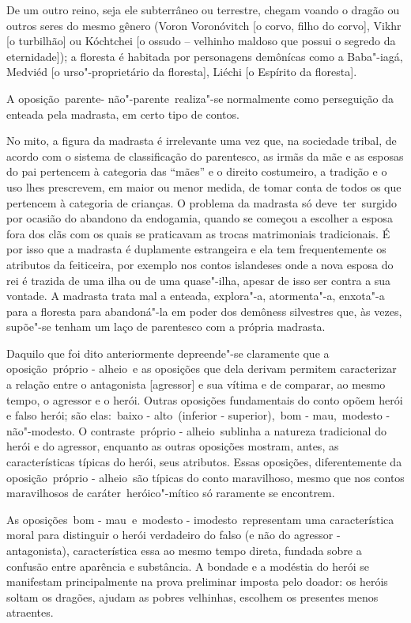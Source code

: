 De um outro reino, seja ele subterrâneo ou terrestre, chegam voando o
dragão ou outros seres do mesmo gênero (Voron Voronóvitch {[}o corvo,
filho do corvo{]}, Vikhr {[}o turbilhão{]} ou Kóchtchei {[}o ossudo --
velhinho maldoso que possui o segredo da eternidade{]}); a floresta é
habitada por personagens demônícas como a Baba"-iagá, Medviéd {[}o
urso"-proprietário da floresta{]}, Liéchi {[}o Espírito da floresta{]}.

A oposição~{parente- não"-parente}~realiza"-se normalmente como
perseguição da enteada pela madrasta, em certo tipo de contos.

No mito, a figura da madrasta é irrelevante uma vez que, na sociedade
tribal, de acordo com o sistema de classificação do parentesco, as irmãs
da mãe e as esposas do pai pertencem à categoria das ``mães'' e o
direito costumeiro, a tradição e o uso lhes prescrevem, em maior ou
menor medida, de tomar conta de todos os que pertencem à categoria de
crianças. O problema da madrasta só deve~ter~surgido por ocasião do
abandono da endogamia, quando se começou a escolher a esposa fora dos
clãs com os quais se praticavam as trocas matrimoniais tradicionais. É
por isso que a madrasta é duplamente estrangeira e ela tem
frequentemente os atributos da feiticeira, por exemplo nos contos
islandeses onde a nova esposa do rei é trazida de uma ilha ou de uma
quase"-ilha, apesar de isso ser contra a sua vontade. A madrasta trata
mal a enteada, explora"-a, atormenta"-a, enxota"-a para a floresta para
abandoná"-la em poder dos demôness silvestres que, às vezes, supõe"-se
tenham um laço de parentesco com a própria madrasta.

Daquilo que foi dito anteriormente depreende"-se claramente que a
oposição~{próprio - alheio}~e as oposições que dela derivam permitem
caracterizar a relação entre o antagonista {[}agressor{]} e sua vítima e
de comparar, ao mesmo tempo, o agressor e o herói. Outras oposições
fundamentais do conto opõem herói e falso herói; são elas:~{baixo -
alto}~(inferior - superior),~{bom - mau},~{modesto - não"-modesto}. O
contraste~{próprio - alheio}~sublinha a natureza tradicional do herói e
do agressor, enquanto as outras oposições mostram, antes, as
características típicas do herói, seus atributos. Essas oposições,
diferentemente da oposição~{próprio - alheio}~são típicas do conto
maravilhoso, mesmo que nos contos maravilhosos de caráter~heróico"-mítico
só raramente se encontrem.

As oposições~{bom - mau}~e~{modesto - imodesto}~representam uma
característica moral para distinguir o herói verdadeiro do falso (e não
do agressor - antagonista), característica essa ao mesmo tempo direta,
fundada sobre a confusão entre aparência e substância. A bondade e a
modéstia do herói se manifestam principalmente na prova preliminar
imposta pelo doador: os heróis soltam os dragões, ajudam as pobres
velhinhas, escolhem os presentes menos atraentes.

